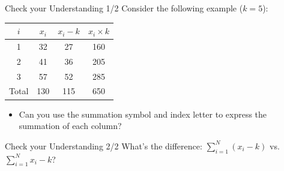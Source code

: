 \documentclass{beamer}
\begin{document}
\begin{frame}{Check your Understanding 1/2}
Consider the following example ($k=5$): 
\begin{center}
\begin{tabular}{c|c|c|c}
\hline 
\rule[-1ex]{0pt}{2.5ex} $i$ & $x_i$ & $x_i - k$ & $x_i \times k$ \\ 
\hline 
\hline 
\rule[-1ex]{0pt}{2.5ex} 1 & 32 & 27 & 160 \\ 
\hline 
\rule[-1ex]{0pt}{2.5ex} 2 & 41 & 36 & 205 \\ 
\hline 
\rule[-1ex]{0pt}{2.5ex} 3 & 57 & 52 & 285 \\ 
\hline 
\hline 
\rule[-1ex]{0pt}{2.5ex} Total & 130 & 115 & 650 \\ 
\hline 
\end{tabular} 
\end{center}

\begin{itemize}
\item Can you use the summation symbol and index letter to express the summation of each column? 

\end{itemize}

\end{frame}


\begin{frame}{Check your Understanding 2/2}
What's the difference: $\sum_{i=1}^{N}(x_i - k) $ vs. $\sum_{i=1}^{N}x_i - k $?

\end{frame}
\end{document}
